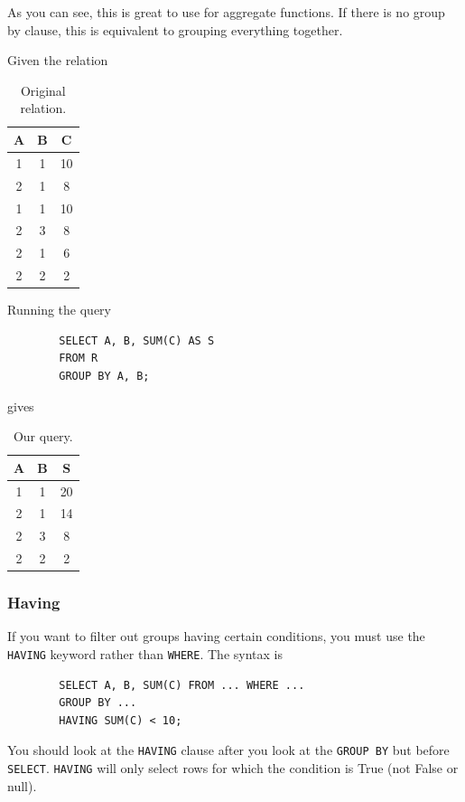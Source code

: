     As you can see, this is great to use for aggregate functions. If there is no group by clause, this is equivalent to grouping everything together.  

    \begin{example}
      Given the relation 

      \begin{table}[H]
        \centering
        \begin{tabular}{|c|c|c|}
          \hline
          \textbf{A} & \textbf{B} & \textbf{C} \\
          \hline
          1 & 1 & 10 \\ 
          2 & 1 & 8 \\ 
          1 & 1 & 10 \\ 
          2 & 3 & 8 \\ 
          2 & 1 & 6 \\ 
          2 & 2 & 2 \\ 
          \hline
        \end{tabular}
        \caption{Original relation. }
        \label{tab:groupby}
      \end{table}
    
      Running the query 
      \begin{lstlisting}
        SELECT A, B, SUM(C) AS S 
        FROM R 
        GROUP BY A, B; 
      \end{lstlisting}
      gives 
      
      \begin{table}[H]
        \centering
        \begin{tabular}{|c|c|c|}
          \hline
          \textbf{A} & \textbf{B} & \textbf{S} \\
          \hline
          1 & 1 & 20 \\ 
          2 & 1 & 14 \\ 
          2 & 3 & 8 \\ 
          2 & 2 & 2 \\ 
          \hline
        \end{tabular}
        \caption{Our query. }
        \label{tab:groupby_output}
      \end{table}
    \end{example}

  \subsubsection{Having} 

    \begin{definition}
      If you want to filter out groups having certain conditions, you must use the \texttt{HAVING} keyword rather than \texttt{WHERE}. The syntax is 
      \begin{lstlisting}
        SELECT A, B, SUM(C) FROM ... WHERE ... 
        GROUP BY ... 
        HAVING SUM(C) < 10; 
      \end{lstlisting}
      You should look at the \texttt{HAVING} clause after you look at the \texttt{GROUP BY} but before \texttt{SELECT}. \texttt{HAVING} will only select rows for which the condition is True (not False or null). 
    \end{definition}


